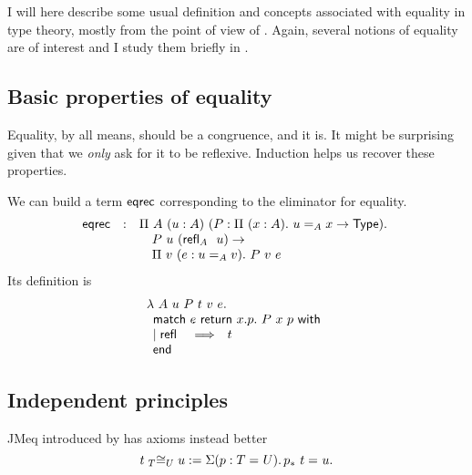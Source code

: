 I will here describe some usual definition and concepts associated with equality
in type theory, mostly from the point of view of \Coq.
Again, several notions of equality are of interest and I study them briefly
in .

\subsection{Basic properties of equality}

Equality, by all means, should be a congruence, and it is. It might be
surprising given that we \emph{only} ask for it to be reflexive.
Induction helps us recover these properties.

We can build a term \(\eqrec\) corresponding to the eliminator for equality.
\[
  \begin{array}{lcl}
    \eqrec &:&
    \Pi\ A\ (u : A)\ (P : \Pi\ (x : A).\ u =_A x \to \Type).\ \\
    && \quad P\ u\ (\refl{A}\ u) \to \\
    && \quad \Pi\ v\ (e : u =_A v).\ P\ v\ e
  \end{array}
\]
Its definition is
\[
  \begin{array}{l}
    \lambda\ A\ u\ P\ t\ v\ e.\ \\
    \pmatch{e}{x.p.\ P\ x\ p}{
      \branch{\refl{}}{t}
    }
  \end{array}
\]

\subsection{Independent principles}


\acrfull{JMeq} introduced by
 has axioms
instead better
\[ \Heq{T}{t}{U}{u} := \Sum{p:\Eq{}{T}{U}} \Eq{}{\transpo{p}\ t}{u}. \]